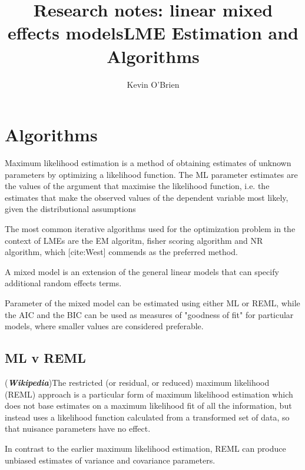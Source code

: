 \documentclass[12pt, a4paper]{article}
\title{Research notes: linear mixed effects models}
\author{ } \date{ }
\theoremstyle{plain}
\theoremstyle{definition}
\theoremstyle{remark}
\begin{document}
\author{Kevin O'Brien}
\title{LME Estimation and Algorithms}

\tableofcontents \setcounter{tocdepth}{2}








\newpage

\section{Algorithms}
Maximum likelihood estimation is a method of obtaining estimates
of unknown parameters by optimizing a likelihood function. The ML
parameter estimates are the values of the argument that maximise
the likelihood function, i.e. the estimates that make the observed
values of the dependent variable most likely, given the
distributional assumptions

The most common iterative algorithms used for the optimization
problem in the context of LMEs are the EM algoritm, fisher scoring
algorithm and NR algorithm, which [cite:West] commends as the
preferred method.

A mixed model is an extension of the general linear models that
can specify additional random effects terms.

Parameter of the mixed model can be estimated using either ML or
REML, while the AIC and the BIC can be used as measures of
"goodness of fit" for particular models, where smaller values are
considered preferable.


\newpage

\subsection{ML v REML}
(\textbf{\emph{Wikipedia}})The restricted (or residual, or reduced) maximum likelihood (REML) approach is a particular form of maximum likelihood estimation which does not base estimates on a maximum likelihood fit of all the information, but instead uses a likelihood function calculated from a transformed set of data, so that nuisance parameters have no effect.

In contrast to the earlier maximum likelihood estimation, REML can produce unbiased estimates of variance and covariance parameters.
\end{document}
